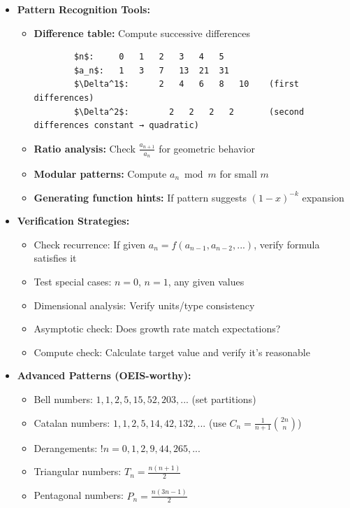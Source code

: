 \documentclass[12pt]{article}
\begin{document}
\begin{itemize}
    \item \textbf{Pattern Recognition Tools:}
    \begin{itemize}
        \item \textbf{Difference table:} Compute successive differences
        \begin{verbatim}
        $n$:     0   1   2   3   4   5
        $a_n$:   1   3   7   13  21  31
        $\Delta^1$:      2   4   6   8   10    (first differences)
        $\Delta^2$:        2   2   2   2       (second differences constant → quadratic)
        \end{verbatim}
        \item \textbf{Ratio analysis:} Check $\frac{a_{n+1}}{a_n}$ for geometric behavior
        \item \textbf{Modular patterns:} Compute $a_n \bmod m$ for small $m$
        \item \textbf{Generating function hints:} If pattern suggests $(1-x)^{-k}$ expansion
    \end{itemize}
    
    \item \textbf{Verification Strategies:}
    \begin{itemize}
        \item Check recurrence: If given $a_n = f(a_{n-1}, a_{n-2},...)$, verify formula satisfies it
        \item Test special cases: $n=0$, $n=1$, any given values
        \item Dimensional analysis: Verify units/type consistency
        \item Asymptotic check: Does growth rate match expectations?
        \item Compute check: Calculate target value and verify it's reasonable
    \end{itemize}
    
    \item \textbf{Advanced Patterns (OEIS-worthy):}
    \begin{itemize}
        \item Bell numbers: $1, 1, 2, 5, 15, 52, 203,...$ (set partitions)
        \item Catalan numbers: $1, 1, 2, 5, 14, 42, 132,...$ (use $C_n = \frac{1}{n+1}\binom{2n}{n}$)
        \item Derangements: $!n = 0, 1, 2, 9, 44, 265,...$
        \item Triangular numbers: $T_n = \frac{n(n+1)}{2}$
        \item Pentagonal numbers: $P_n = \frac{n(3n-1)}{2}$
    \end{itemize}
    

\end{itemize}
\end{document}
